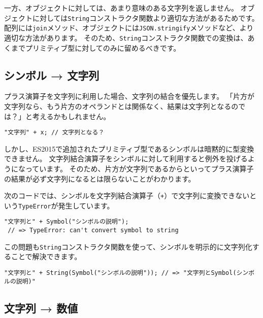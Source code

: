 一方、オブジェクトに対しては、あまり意味のある文字列を返しません。
オブジェクトに対しては\texttt{String}コンストラクタ関数より適切な方法があるためです。
配列には\texttt{join}メソッド、オブジェクトには\texttt{JSON.stringify}メソッドなど、より適切な方法があります。
そのため、\texttt{String}コンストラクタ関数での変換は、あくまでプリミティブ型に対してのみに留めるべきです。

\hypertarget{symbol-to-string}{%
\subsection{シンボル → 文字列}\label{symbol-to-string}}

プラス演算子を文字列に利用した場合、文字列の結合を優先します。
「片方が文字列なら、もう片方のオペランドとは関係なく、結果は文字列となるのでは？」と考えるかもしれません。

\begin{lstlisting}
"文字列" + x; // 文字列となる？
\end{lstlisting}

しかし、ES2015で追加されたプリミティブ型であるシンボルは暗黙的に型変換できません。
文字列結合演算子をシンボルに対して利用すると例外を投げるようになっています。
そのため、片方が文字列であるからといってプラス演算子の結果が必ず文字列になるとは限らないことがわかります。

次のコードでは、シンボルを文字列結合演算子（\texttt{+}）で文字列に変換できないという\texttt{TypeError}が発生しています。

\begin{lstlisting}
"文字列と" + Symbol("シンボルの説明");
 // => TypeError: can't convert symbol to string
\end{lstlisting}

\enlargethispage{\baselineskip}この問題も\texttt{String}コンストラクタ関数を使って、シンボルを明示的に文字列化することで解決できます。

\begin{lstlisting}
"文字列と" + String(Symbol("シンボルの説明")); // => "文字列とSymbol(シンボルの説明)"
\end{lstlisting}

\hypertarget{string-to-number}{%
\subsection{文字列 → 数値}\label{string-to-number}}

